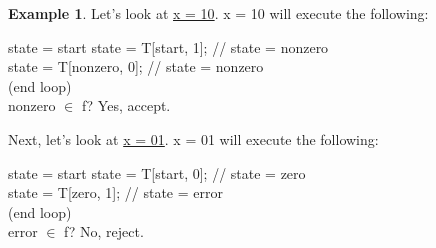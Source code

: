 \documentclass[]{article}
\theoremstyle{definition}
\newtheorem{ex}{Example}[section]
\begin{document}
\begin{ex}
					Let's look at \underline{x = 10}. x = 10 will execute the following: \\
					\begin{algorithm}[H]
						state = start\;
						state = T[start, 1]; // state = nonzero \\
						state = T[nonzero, 0]; // state = nonzero \\
						(end loop) \\
						nonzero $\in $ f? Yes, accept.
					\end{algorithm}
					\vspace{0.5cm}
					Next, let's look at \underline{x = 01}. x = 01 will execute the following: \\
					\begin{algorithm}[H]
						state = start\;
						state = T[start, 0]; // state = zero \\
						state = T[zero, 1]; // state = error \\
						(end loop) \\
						error $\in $ f? No, reject.
					\end{algorithm}
				\end{ex}
\end{document}
